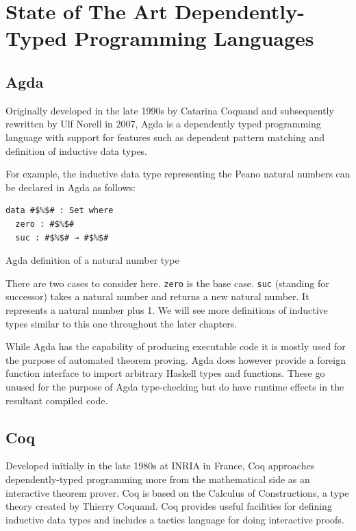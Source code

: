 \documentclass[a4paper, notitlepage]{report}
\begin{document}
\section{State of The Art Dependently-Typed Programming Languages}
\label{sec:org5b3571c}
\subsection{Agda}
\label{sec:org9b20851}
Originally developed in the late 1990s by Catarina Coquand and subsequently
rewritten by Ulf Norell in 2007, Agda is a dependently typed programming
language with support for features such as dependent pattern matching and
definition of inductive data types.

For example, the inductive data type representing the Peano natural numbers can
be declared in Agda as follows:

\begin{listing}[H]
\begin{verbatim}
data #$ℕ$# : Set where
  zero : #$ℕ$#
  suc : #$ℕ$# → #$ℕ$#
\end{verbatim}
\caption{Agda definition of a natural number type}
\end{listing}

There are two cases to consider here. \texttt{zero} is the base case. \texttt{suc} (standing
for successor) takes a natural number and returns a new natural number. It
represents a natural number plus 1. We will see more definitions of inductive
types similar to this one throughout the later chapters.

While Agda has the capability of producing executable code it is mostly used for
the purpose of automated theorem proving. Agda does however provide a foreign
function interface to import arbitrary Haskell types and functions. These go
unused for the purpose of Agda type-checking but do have runtime effects in the
resultant compiled code.

\subsection{Coq}
\label{sec:org13e21d8}
Developed initially in the late 1980s at INRIA in France, Coq approaches
dependently-typed programming more from the mathematical side as an interactive
theorem prover. Coq is based on the Calculus of Constructions, a type theory
created by Thierry Coquand. Coq provides useful facilities for defining
inductive data types and includes a tactics language for doing interactive
proofs.
\end{document}
